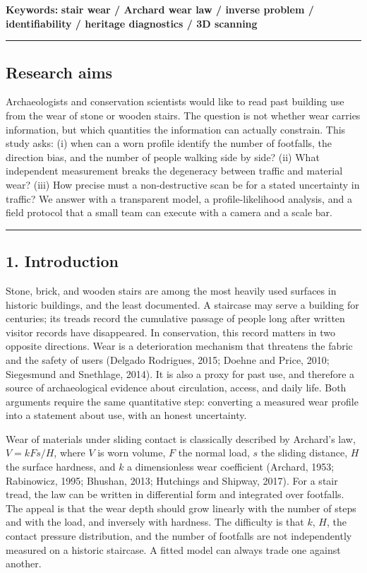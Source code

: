 \documentclass[
]{article}
\begin{document}
\textbf{Keywords:} \textbf{stair wear / Archard wear law / inverse
problem / identifiability / heritage diagnostics / 3D scanning}

\begin{center}\rule{0.5\linewidth}{0.5pt}\end{center}

\subsection{Research aims}\label{research-aims}

Archaeologists and conservation scientists would like to read past
building use from the wear of stone or wooden stairs. The question is
not whether wear carries information, but which quantities the
information can actually constrain. This study asks: (i) when can a worn
profile identify the number of footfalls, the direction bias, and the
number of people walking side by side? (ii) What independent measurement
breaks the degeneracy between traffic and material wear? (iii) How
precise must a non-destructive scan be for a stated uncertainty in
traffic? We answer with a transparent model, a profile-likelihood
analysis, and a field protocol that a small team can execute with a
camera and a scale bar.

\begin{center}\rule{0.5\linewidth}{0.5pt}\end{center}

\subsection{1. Introduction}\label{introduction}

Stone, brick, and wooden stairs are among the most heavily used surfaces
in historic buildings, and the least documented. A staircase may serve a
building for centuries; its treads record the cumulative passage of
people long after written visitor records have disappeared. In
conservation, this record matters in two opposite directions. Wear is a
deterioration mechanism that threatens the fabric and the safety of
users (Delgado Rodrigues, 2015; Doehne and Price, 2010; Siegesmund and
Snethlage, 2014). It is also a proxy for past use, and therefore a
source of archaeological evidence about circulation, access, and daily
life. Both arguments require the same quantitative step: converting a
measured wear profile into a statement about use, with an honest
uncertainty.

Wear of materials under sliding contact is classically described by
Archard's law, \(V = k F s / H\), where \(V\) is worn volume, \(F\) the
normal load, \(s\) the sliding distance, \(H\) the surface hardness, and
\(k\) a dimensionless wear coefficient (Archard, 1953; Rabinowicz, 1995;
Bhushan, 2013; Hutchings and Shipway, 2017). For a stair tread, the law
can be written in differential form and integrated over footfalls. The
appeal is that the wear depth should grow linearly with the number of
steps and with the load, and inversely with hardness. The difficulty is
that \(k\), \(H\), the contact pressure distribution, and the number of
footfalls are not independently measured on a historic staircase. A
fitted model can always trade one against another.
\end{document}
